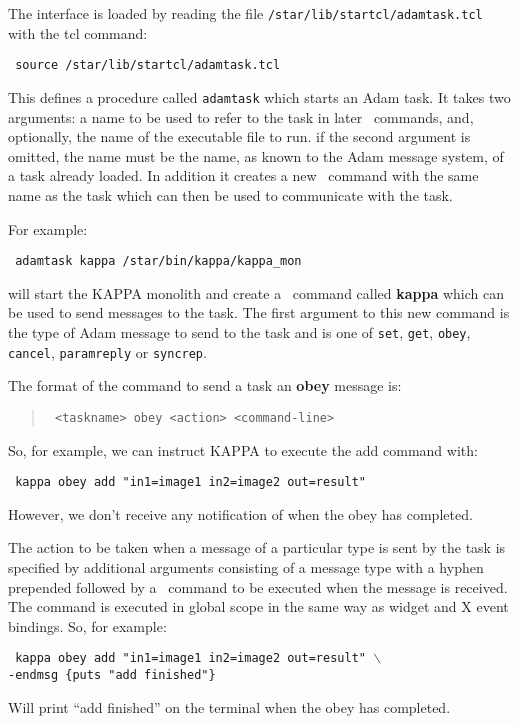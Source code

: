The interface is loaded by reading the file
{\tt{/star/lib/startcl/adamtask.tcl}} with the tcl command:

\begin{tquote}{\tt
source /star/lib/startcl/adamtask.tcl
}\end{tquote}

This defines a procedure called {\tt adamtask} which starts an Adam
task. It takes two arguments: a name to be used to refer to the task in later
\Tcl\ commands, and, optionally, the name of the executable file to run.
if the second argument is omitted, the name must be the name, as known to the
Adam message system, of a task already loaded.
In addition it
creates a new \Tcl\ command with the same name as the task which can then be
used to communicate with the task.

For example:
\begin{tquote}{\tt
adamtask kappa /star/bin/kappa/kappa\_mon
}\end{tquote}
will start the KAPPA monolith and create a \Tcl\ command called {\bf kappa}
which can be used to send messages to the task.
The first argument to this new command is the type of Adam message to
send to the task and is one of {\tt set}, {\tt get}, {\tt obey}, {\tt
cancel}, {\tt paramreply} or {\tt syncrep}.

The format of the command to send a task an {\bf obey} message is:
\begin{quote}{\tt
<taskname> obey <action> <command-line>
}\end{quote}
So, for example, we can instruct KAPPA to execute the add command with:
\begin{tquote}{\tt
kappa obey add "in1=image1 in2=image2 out=result"
}\end{tquote}
However, we don't receive any notification of when the obey has
completed.

The action to be taken when a message of a particular type is sent by the
task is specified by additional arguments consisting of a message type
with a hyphen prepended followed by a \Tcl\ command to be executed when the
message is received. The command is executed in global scope in the same
way as widget and X event bindings. So, for example:
\begin{tquote}{\tt
kappa obey add "in1=image1 in2=image2 out=result" $\backslash$\\
\hspace*{2em}-endmsg \{puts "add finished"\}
}\end{tquote}
Will print ``add finished'' on the terminal when the obey has completed.

